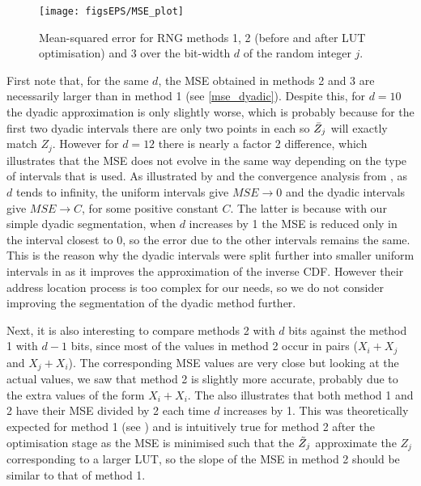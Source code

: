 \begin{figure}[!h]
    \centering
    \texttt{[image: figsEPS/MSE\_plot]}
    \caption{Mean-squared error for RNG methods 1, 2 (before and after LUT optimisation) and 3 over the bit-width $d$ of the random integer $j$.} 
    \label{fig:MSE_plot}
\end{figure}

First note that, for the same $d$, the MSE obtained in methods 2 and 3 are necessarily larger than in method 1 (see \eqref{mse_dyadic}). Despite this, for $d=10$ the dyadic approximation is only slightly worse, which is probably because for the first two dyadic intervals there are only two points in each so $\Bar{Z}_j$ will exactly match $Z_j$. However for $d=12$ there is nearly a factor 2 difference, which illustrates that the MSE does not evolve in the same way depending on the type of intervals that is used. As illustrated by  and the convergence analysis from \cite{approximateICDF_Oliver},
as $d$ tends to infinity, the uniform intervals give $MSE \longrightarrow 0$ and the dyadic intervals give $MSE \longrightarrow C$, for some positive constant $C$. The latter is because with our simple dyadic segmentation, when $d$ increases by 1 the MSE is reduced only in the interval closest to 0, so the error due to the other intervals remains the same.
This is the reason why the dyadic intervals were split further into smaller uniform intervals in \cite{Lee_segmentation} as it improves the approximation of the inverse CDF. 
However their address location process is too complex for our needs, so we do not consider improving the segmentation of the dyadic method further.


Next, it is also interesting to compare methods 2 with $d$ bits against the method 1 with $d-1$ bits, since most of the values in method 2 occur in pairs ($X_i+X_j$ and $X_j+X_i$). The corresponding MSE values are very close but looking at the actual values, we saw that method 2 is slightly more accurate, probably due to the extra values of the form $X_i+X_i$.
The  also illustrates that both method 1 and 2 have their MSE divided by 2 each time $d$ increases by 1. This was theoretically expected for method 1 (see \cite{approximateICDF_Oliver}) and is intuitively true for method 2 after the optimisation stage as the MSE is minimised such that the $\Tilde{Z}_j$ approximate the $Z_j$ corresponding to a larger LUT, so the slope of the MSE in method 2 should be similar to that of method 1. 

